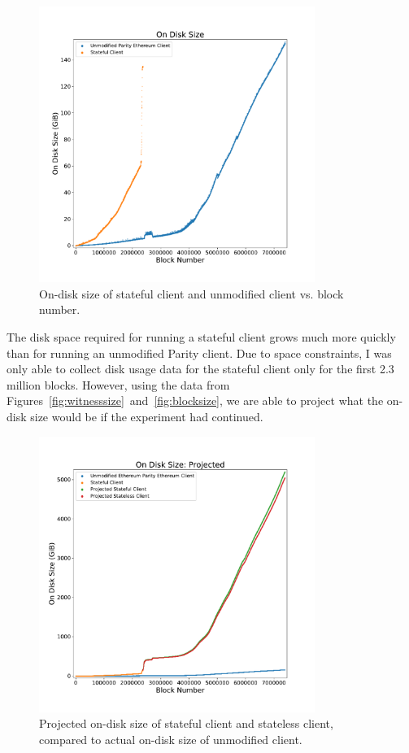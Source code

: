 \documentclass[12pt]{article}
\begin{document}
\begin{figure}[H]
  \centering
  \includegraphics[width=0.8\textwidth]{../figures/results/graphs/background/on-disk-size.pdf}
  \caption{On-disk size of stateful client and unmodified client vs. block number.}
  \label{fig:ondisksize}
\end{figure}

The disk space required for running a stateful client grows much more quickly than for running an unmodified Parity client. Due to space constraints, I was only able to collect disk usage data for the stateful client only for the first 2.3 million blocks. However, using the data from Figures~\ref{fig:witnesssize}~and~\ref{fig:blocksize}, we are able to project what the on-disk size would be if the experiment had continued.

\begin{figure}[H]
  \centering
  \includegraphics[width=0.8\textwidth]{../figures/results/graphs/background/projected-on-disk-size.pdf}
  \caption{Projected on-disk size of stateful client and stateless client, compared to actual on-disk size of unmodified client.}
  \label{fig:projectedondisksize}
\end{figure}
\end{document}
